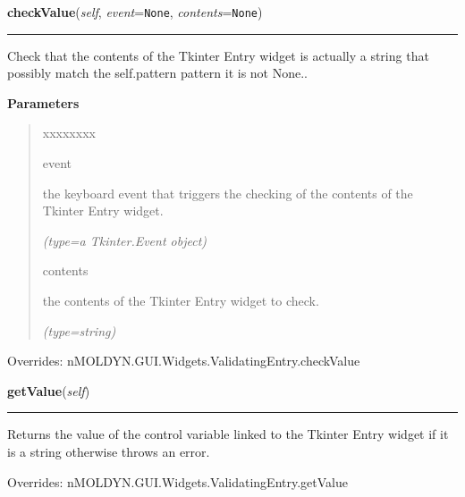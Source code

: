     \vspace{0.5ex}

\hspace{.8\funcindent}\begin{boxedminipage}{\funcwidth}

    \raggedright \textbf{checkValue}(\textit{self}, \textit{event}={\tt None}, \textit{contents}={\tt None})

    \vspace{-1.5ex}

    \rule{\textwidth}{0.5\fboxrule}
\setlength{\parskip}{2ex}
    Check that the contents of the Tkinter Entry widget is actually a 
    string that possibly match the {\textbar}self.pattern{\textbar} pattern
    it is not None..

\setlength{\parskip}{1ex}
      \textbf{Parameters}
      \vspace{-1ex}

      \begin{quote}
        \begin{Ventry}{xxxxxxxx}

          \item[event]

          the keyboard event that triggers the checking of the contents of 
          the Tkinter Entry widget.

            {\it (type=a Tkinter.Event object)}

          \item[contents]

          the contents of the Tkinter Entry widget to check.

            {\it (type=string)}

        \end{Ventry}

      \end{quote}

      Overrides: nMOLDYN.GUI.Widgets.ValidatingEntry.checkValue

    \end{boxedminipage}

    \vspace{0.5ex}

\hspace{.8\funcindent}\begin{boxedminipage}{\funcwidth}

    \raggedright \textbf{getValue}(\textit{self})

    \vspace{-1.5ex}

    \rule{\textwidth}{0.5\fboxrule}
\setlength{\parskip}{2ex}
    Returns the value of the control variable linked to the Tkinter Entry 
    widget if it is a string otherwise throws an error.

\setlength{\parskip}{1ex}
      Overrides: nMOLDYN.GUI.Widgets.ValidatingEntry.getValue

    \end{boxedminipage}


